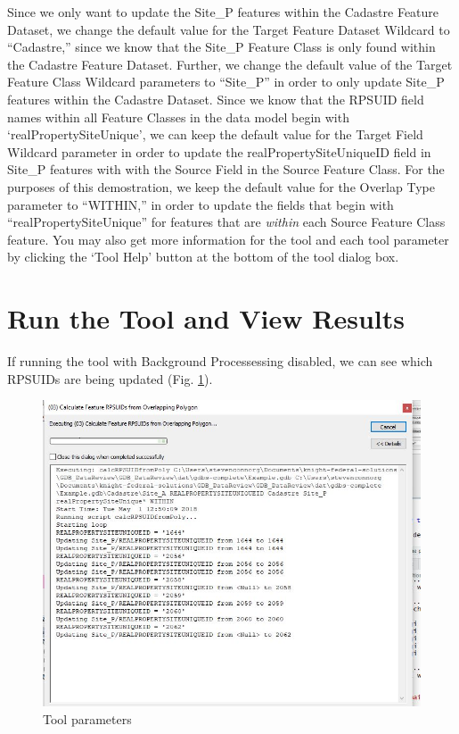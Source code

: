 \documentclass[openany]{book}
\theoremstyle{definition}
\theoremstyle{definition}
\theoremstyle{definition}
\theoremstyle{remark}
\begin{document}
Since we only want to update the Site\_P features within the Cadastre
Feature Dataset, we change the default value for the Target Feature
Dataset Wildcard to ``Cadastre,'' since we know that the Site\_P Feature
Class is only found within the Cadastre Feature Dataset. Further, we
change the default value of the Target Feature Class Wildcard parameters
to ``Site\_P'' in order to only update Site\_P features within the
Cadastre Dataset. Since we know that the RPSUID field names within all
Feature Classes in the data model begin with `realPropertySiteUnique',
we can keep the default value for the Target Field Wildcard parameter in
order to update the realPropertySiteUniqueID field in Site\_P features
with with the Source Field in the Source Feature Class. For the purposes
of this demostration, we keep the default value for the Overlap Type
parameter to ``WITHIN,'' in order to update the fields that begin with
``realPropertySiteUnique'' for features that are \emph{within} each
Source Feature Class feature. You may also get more information for the
tool and each tool parameter by clicking the `Tool Help' button at the
bottom of the tool dialog box.

\section{Run the Tool and View
Results}\label{run-the-tool-and-view-results-2}

If running the tool with Background Processessing disabled, we can see
which RPSUIDs are being updated (Fig. \ref{fig:sjcmessages}).

\begin{figure}[H]

{\centering \includegraphics{figures/spatjoinCalc-toolmessages} 

}

\caption{Tool parameters}\label{fig:sjcmessages}
\end{figure}
\end{document}
